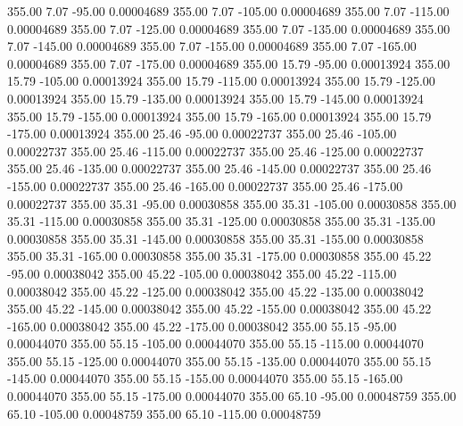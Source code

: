     355.00      7.07    -95.00     0.00004689
    355.00      7.07   -105.00     0.00004689
    355.00      7.07   -115.00     0.00004689
    355.00      7.07   -125.00     0.00004689
    355.00      7.07   -135.00     0.00004689
    355.00      7.07   -145.00     0.00004689
    355.00      7.07   -155.00     0.00004689
    355.00      7.07   -165.00     0.00004689
    355.00      7.07   -175.00     0.00004689
    355.00     15.79    -95.00     0.00013924
    355.00     15.79   -105.00     0.00013924
    355.00     15.79   -115.00     0.00013924
    355.00     15.79   -125.00     0.00013924
    355.00     15.79   -135.00     0.00013924
    355.00     15.79   -145.00     0.00013924
    355.00     15.79   -155.00     0.00013924
    355.00     15.79   -165.00     0.00013924
    355.00     15.79   -175.00     0.00013924
    355.00     25.46    -95.00     0.00022737
    355.00     25.46   -105.00     0.00022737
    355.00     25.46   -115.00     0.00022737
    355.00     25.46   -125.00     0.00022737
    355.00     25.46   -135.00     0.00022737
    355.00     25.46   -145.00     0.00022737
    355.00     25.46   -155.00     0.00022737
    355.00     25.46   -165.00     0.00022737
    355.00     25.46   -175.00     0.00022737
    355.00     35.31    -95.00     0.00030858
    355.00     35.31   -105.00     0.00030858
    355.00     35.31   -115.00     0.00030858
    355.00     35.31   -125.00     0.00030858
    355.00     35.31   -135.00     0.00030858
    355.00     35.31   -145.00     0.00030858
    355.00     35.31   -155.00     0.00030858
    355.00     35.31   -165.00     0.00030858
    355.00     35.31   -175.00     0.00030858
    355.00     45.22    -95.00     0.00038042
    355.00     45.22   -105.00     0.00038042
    355.00     45.22   -115.00     0.00038042
    355.00     45.22   -125.00     0.00038042
    355.00     45.22   -135.00     0.00038042
    355.00     45.22   -145.00     0.00038042
    355.00     45.22   -155.00     0.00038042
    355.00     45.22   -165.00     0.00038042
    355.00     45.22   -175.00     0.00038042
    355.00     55.15    -95.00     0.00044070
    355.00     55.15   -105.00     0.00044070
    355.00     55.15   -115.00     0.00044070
    355.00     55.15   -125.00     0.00044070
    355.00     55.15   -135.00     0.00044070
    355.00     55.15   -145.00     0.00044070
    355.00     55.15   -155.00     0.00044070
    355.00     55.15   -165.00     0.00044070
    355.00     55.15   -175.00     0.00044070
    355.00     65.10    -95.00     0.00048759
    355.00     65.10   -105.00     0.00048759
    355.00     65.10   -115.00     0.00048759

